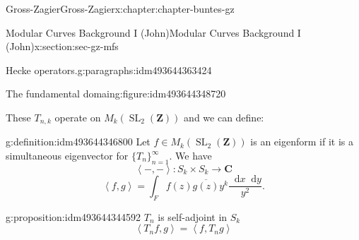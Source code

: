 \documentclass[oneside,10pt,]{book}
\numberwithin{equation}{section}
\newcommand{\diff}{\mathop{}\!\mathrm{d}}
\newcommand{\pair}[2]{\left\langle #1, #2 \right\rangle}
\newcommand{\ZZ}{\mathbf{Z}}
\newcommand{\CC}{\mathbf{C}}
\DeclareMathOperator{\SL}{SL}
\begin{document}
\begin{chapterptx}{Gross-Zagier}{}{Gross-Zagier}{}{}{x:chapter:chapter-buntes-gz}
\begin{sectionptx}{Modular Curves Background I (John)}{}{Modular Curves Background I (John)}{}{}{x:section:sec-gz-mfs}
\begin{paragraphs}{Hecke operators.}{g:paragraphs:idm493644363424}
\begin{figureptx}{The fundamental domain}{g:figure:idm493644348720}{}
\begin{image}{0}{1}{0}
{
}%
\end{image}%
\tcblower
\end{figureptx}%
These \(T_{n,k}\) operate on \(M_k(\SL_2(\ZZ))\) and we can define:%
\begin{definition}{}{g:definition:idm493644346800}%
Let \(f\in M_k(\SL_2(\ZZ))\) is an eigenform if it is a simultaneous eigenvector for \(\{T_n\}_{n=1}^\infty \). We have%
\begin{equation*}
\pair - - \colon  S_k \times S_k\to \CC
\end{equation*}
%
\begin{equation*}
\pair fg = \int_F f(z) \overline{g(z)} y^k \frac{\diff x \diff y}{y^2}\text{.}
\end{equation*}
%
\end{definition}
\begin{proposition}{}{}{g:proposition:idm493644344592}%
\(T_n\) is self-adjoint in \(S_k\)%
\begin{equation*}
\pair{T_n f}{g}=  \pair {f}{T_ng} 
\end{equation*}

\end{proposition}
\end{paragraphs}
\end{sectionptx}
\end{chapterptx}
\end{document}
